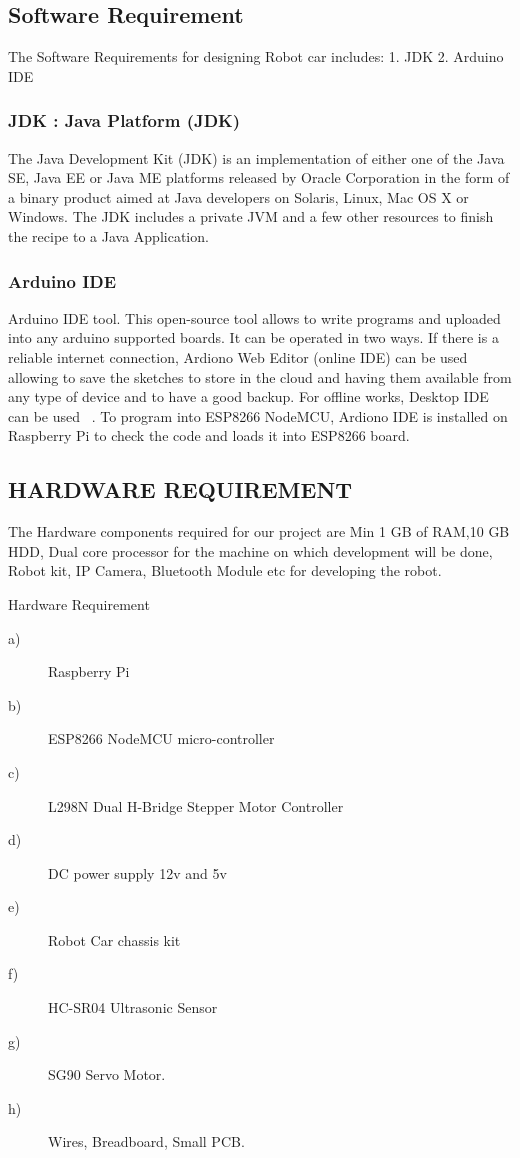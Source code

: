 \documentclass[sigconf]{acmart}
\begin{document}
\subsection{Software Requirement}
The Software Requirements for designing Robot car includes:
1. JDK
2. Arduino IDE

\subsubsection{JDK : Java Platform (JDK)}
The Java Development Kit (JDK) is an implementation
of either one of the Java SE, Java EE or Java ME platforms released by Oracle Corporation in the form of a binary product aimed at Java developers on Solaris, Linux, Mac OS X or Windows. The JDK includes a private JVM and a few other resources to finish the recipe to a Java Application.

\subsubsection{Arduino IDE}
Arduino IDE tool. This open-source tool allows to write programs and uploaded into any arduino supported boards. It can be operated in two ways. If there is a reliable internet connection, Ardiono Web Editor (online IDE) can be used allowing to save the sketches to store in the cloud and having them available from any type of device and to have a good backup. For offline works, Desktop IDE can be used ~\cite{arduino2015}. To program into ESP8266 NodeMCU, Ardiono IDE is installed on Raspberry Pi to check the code and loads it into ESP8266 board.

\subsection{HARDWARE REQUIREMENT}
The Hardware components required for our project are Min 1 GB of RAM,10 GB HDD, Dual core processor for the machine on which development will be done, Robot kit, IP Camera, Bluetooth Module etc for developing the robot.

Hardware Requirement
\begin{description}
\item[a)] Raspberry Pi
\item[b)] ESP8266 NodeMCU micro-controller
\item[c)] L298N Dual H-Bridge Stepper Motor Controller
\item[d)] DC power supply 12v and 5v
\item[e)] Robot Car chassis kit
\item[f)] HC-SR04 Ultrasonic Sensor
\item[g)] SG90 Servo Motor.
\item[h)] Wires, Breadboard, Small PCB.
\end{description}
\end{document}
